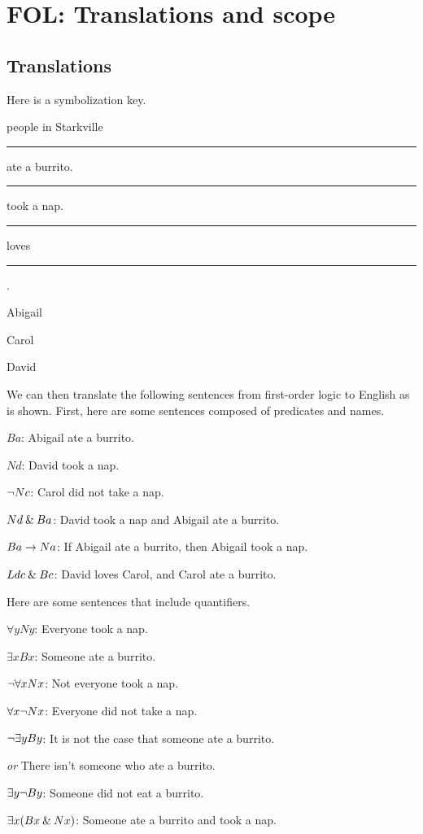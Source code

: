 \graphicspath{{figures--proofs/}}

\chapter{FOL: Translations and scope}\label{FOL-basics}

\section{Translations}

Here is a symbolization key.

\begin{ekey}
	\item[\textrm{domain}] people in Starkville
	\item[B] \rule{1cm}{0.15mm} ate a burrito.
	\item[N] \rule{1cm}{0.15mm} took a nap.
	\item[L] \rule{1cm}{0.15mm} loves \rule{1cm}{0.15mm} .
	\item[a] Abigail
	\item[c] Carol
	\item[d] David
\end{ekey}

\noindent We can then translate the following sentences from first-order logic to English as is shown. First, here are some sentences composed of predicates and names.

\begin{ebullet}
	\item[]$Ba $: Abigail ate a burrito.\smallskip
	\item[]$Nd $: David took a nap.\smallskip
	\item[]${\neg} Nc$: Carol did not take a nap.\smallskip
	\item[]$Nd \mathbin{\&} Ba $: David took a nap and Abigail ate a burrito.\smallskip
	\item[]$Ba \rightarrow Na$: If Abigail ate a burrito, then Abigail took a nap.\smallskip
	\item[]$Ldc \mathbin{\&} Bc$: David loves Carol, and Carol ate a burrito.
\end{ebullet}

\noindent Here are some sentences that include quantifiers.

\begin{ebullet}
	\item[] $\forall y Ny$: Everyone took a nap.\smallskip
	\item[] $\exists x Bx$: Someone ate a burrito.\smallskip
	\item[] ${\neg}\forall xNx$: Not everyone took a nap.\smallskip
	\item[]$\forall x {\neg} Nx$: Everyone did not take a nap.\smallskip
	\item[]${\neg}\exists yBy$: It is not the case that someone ate a burrito. 
	\item[]\quad\quad\quad \textit{or} There isn't someone who ate a burrito.\smallskip
	\item[]$\exists y {\neg} By$: Someone did not eat a burrito.\smallskip
	\item[]$\exists x(Bx \mathbin{\&} Nx)$: Someone ate a burrito and took a nap.\smallskip
\end{ebullet}


